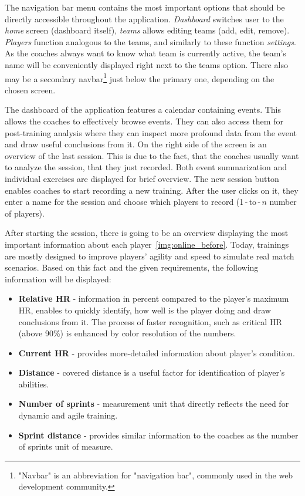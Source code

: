 The navigation bar menu contains the most important options that should be directly accessible throughout the application. \textit{Dashboard} switches user to the \textit{home} screen (dashboard itself), \textit{teams} allows editing teams (add, edit, remove). \textit{Players} function analogous to the teams, and similarly to these function \textit{settings}. As the coaches always want to know what team is currently active, the team’s name will be conveniently displayed right next to the teams option. There also may be a secondary navbar\footnote{"Navbar" is an abbreviation for "navigation bar", commonly used in the web development community.} just below the primary one, depending on the chosen screen.

The dashboard of the application features a calendar containing events. This allows the coaches to effectively browse events. They can also access them for post-training analysis where they can inspect more profound data from the event and draw useful conclusions from it. On the right side of the screen is an overview of the last session. This is due to the fact, that the coaches usually want to analyze the session, that they just recorded. Both event summarization and individual exercises are displayed for brief overview. The new session button enables coaches to start recording a new training. After the user clicks on it, they enter a name for the session and choose which players to record (1\,-\,to\,-\,\(n\) number of players).

After starting the session, there is going to be an overview displaying the most important information about each player~\ref{img:online_before}. Today, trainings are mostly designed to improve players’ agility and speed to simulate real match scenarios. Based on this fact and the given requirements, the following information will be displayed:

\begin{itemize}
\item \textbf{Relative HR} - information in percent compared to the player’s maximum HR, enables to quickly identify, how well is the player doing and draw conclusions from it. The process of faster recognition, such as critical HR (above 90\%) is enhanced by color resolution of the numbers.
\item \textbf{Current HR} - provides more-detailed information about player’s condition.
\item \textbf{Distance} - covered distance is a useful factor for identification of player’s abilities.
\item \textbf{Number of sprints} - measurement unit that directly reflects the need for dynamic and agile training.
\item \textbf{Sprint distance} - provides similar information to the coaches as the number of sprints unit of measure.
\end{itemize}

